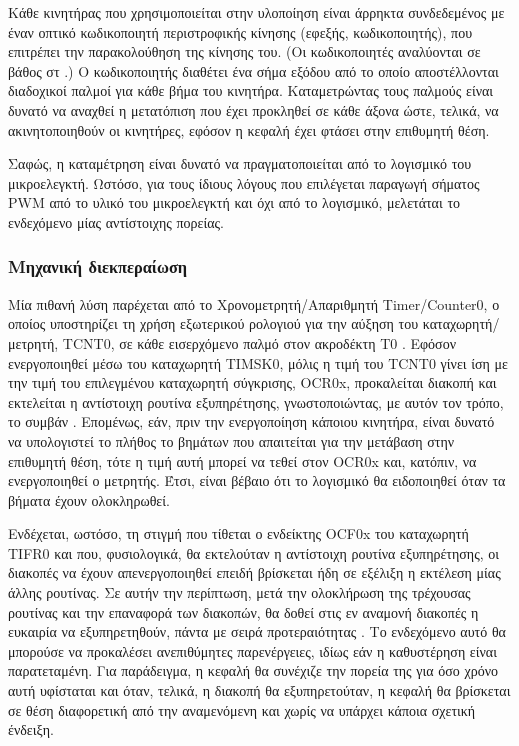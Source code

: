 Κάθε κινητήρας που χρησιμοποιείται στην υλοποίηση είναι άρρηκτα συνδεδεμένος με
έναν οπτικό κωδικοποιητή περιστροφικής κίνησης (εφεξής, κωδικοποιητής), που
επιτρέπει την παρακολούθηση της κίνησης του. (Οι κωδικοποιητές αναλύονται σε
βάθος στ \nref.)
Ο κωδικοποιητής διαθέτει ένα σήμα εξόδου από το οποίο αποστέλλονται διαδοχικοί
παλμοί για κάθε βήμα του κινητήρα. Καταμετρώντας τους παλμούς είναι δυνατό να
αναχθεί η μετατόπιση που έχει προκληθεί σε κάθε άξονα ώστε, τελικά, να
ακινητοποιηθούν οι κινητήρες, εφόσον η κεφαλή έχει φτάσει στην επιθυμητή θέση.

Σαφώς, η καταμέτρηση είναι δυνατό να πραγματοποιείται από το λογισμικό του
μικροελεγκτή. Ωστόσο, για τους ίδιους λόγους που επιλέγεται παραγωγή σήματος PWM
από το υλικό του μικροελεγκτή και όχι από το λογισμικό, μελετάται το ενδεχόμενο
μίας αντίστοιχης πορείας.


\subsubsection{Μηχανική διεκπεραίωση}

Μία πιθανή λύση παρέχεται από το Χρονομετρητή\slash Απαριθμητή
\textenglish{Timer\slash Counter0}, ο οποίος υποστηρίζει τη χρήση εξωτερικού
ρολογιού για την αύξηση του καταχωρητή\slash μετρητή, TCNT0, σε κάθε εισερχόμενο
παλμό στον ακροδέκτη T0 \parencite[109]{atmel13}. Εφόσον ενεργοποιηθεί μέσω του
καταχωρητή TIMSK0, μόλις η τιμή του TCNT0 γίνει ίση με την τιμή του επιλεγμένου
καταχωρητή σύγκρισης, OCR0x, προκαλείται διακοπή και εκτελείται η αντίστοιχη
ρουτίνα εξυπηρέτησης, γνωστοποιώντας, με αυτόν τον τρόπο, το συμβάν
\parencite[110]{atmel13}. Επομένως, εάν, πριν την ενεργοποίηση κάποιου κινητήρα,
είναι δυνατό να υπολογιστεί το πλήθος το βημάτων που απαιτείται για την μετάβαση
στην επιθυμητή θέση, τότε η τιμή αυτή μπορεί να τεθεί στον OCR0x και, κατόπιν,
να ενεργοποιηθεί ο μετρητής. Έτσι, είναι βέβαιο ότι το λογισμικό θα ειδοποιηθεί
όταν τα βήματα έχουν ολοκληρωθεί.

Ενδέχεται, ωστόσο, τη στιγμή που τίθεται ο ενδείκτης OCF0x του καταχωρητή TIFR0
και που, φυσιολογικά, θα εκτελούταν η αντίστοιχη ρουτίνα εξυπηρέτησης, οι
διακοπές να έχουν απενεργοποιηθεί επειδή βρίσκεται ήδη σε εξέλιξη η εκτέλεση
μίας άλλης ρουτίνας. Σε αυτήν την περίπτωση, μετά την ολοκλήρωση της τρέχουσας
ρουτίνας και την επαναφορά των διακοπών, θα δοθεί στις εν αναμονή διακοπές η
ευκαιρία να εξυπηρετηθούν, πάντα με σειρά προτεραιότητας
\parencite[13--14,57]{atmel13}. Το ενδεχόμενο αυτό θα μπορούσε να προκαλέσει
ανεπιθύμητες παρενέργειες, ιδίως εάν η καθυστέρηση είναι παρατεταμένη. Για
παράδειγμα, η κεφαλή θα συνέχιζε την πορεία της για όσο χρόνο αυτή υφίσταται και
όταν, τελικά, η διακοπή θα εξυπηρετούταν, η κεφαλή θα βρίσκεται σε θέση
διαφορετική από την αναμενόμενη και χωρίς να υπάρχει κάποια σχετική ένδειξη.

